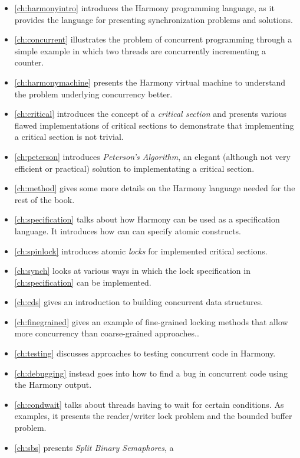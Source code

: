 \documentclass{report}
\begin{document}
\begin{itemize}
\item \autoref{ch:harmonyintro} introduces the Harmony programming
language, as it provides the language for presenting synchronization
problems and solutions.
\item \autoref{ch:concurrent} illustrates the problem of
concurrent programming through a simple example in which two threads
are concurrently incrementing a counter.
\item \autoref{ch:harmonymachine} presents the
Harmony virtual machine to understand the problem
underlying concurrency better.
\item \autoref{ch:critical} introduces the concept of a
\emph{critical section} and presents various flawed implementations
of critical sections to demonstrate that implementing a critical section
is not trivial.
\item \autoref{ch:peterson} introduces \emph{Peterson's Algorithm}, an
elegant (although not very efficient or practical) solution to implementating a critical section.
\item \autoref{ch:method} gives some more details on the Harmony
language needed for the rest of the book.
\item \autoref{ch:specification} talks about how Harmony can be used as
a specification language.  It introduces how can can specify atomic
constructs.
\item \autoref{ch:spinlock} introduces atomic \emph{locks}
for implemented critical sections.
\item \autoref{ch:synch} looks at various ways in which the lock specification
in \autoref{ch:specification} can be implemented.
\item \autoref{ch:cds} gives an introduction to building concurrent
data structures.
\item \autoref{ch:finegrained} gives an example of fine-grained locking
methods that allow more concurrency than coarse-grained approaches..
\item \autoref{ch:testing} discusses approaches to testing
concurrent code in Harmony.
\item \autoref{ch:debugging} instead goes into how to find a bug
in concurrent code using the Harmony output.
\item \autoref{ch:condwait} talks about threads having to wait for
certain conditions.  As examples, it presents the reader/writer lock
problem and the bounded buffer problem.
\item \autoref{ch:sbs} presents \emph{Split Binary Semaphores}, a

\end{itemize}
\end{document}
